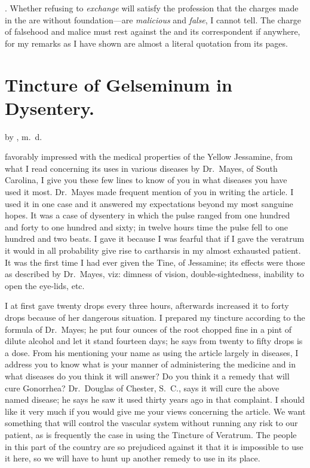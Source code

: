 . Whether refusing to \emph{exchange} will
satisfy the profession that the charges made in the  are without
foundation---are \emph{malicious} and \emph{false}, I cannot tell. The charge of falsehood
and malice must rest against the  and its correspondent
if anywhere, for my remarks as I have shown are almost a literal quotation
from its pages.

\section*{Tincture of Gelseminum in Dysentery.}

by , m.~d.

 favorably impressed with the medical properties of the Yellow
Jessamine, from what I read concerning its uses in various diseases by
Dr.~Mayes, of South Carolina, I give you these few lines to know of
you in what diseases you have used it most. Dr.~Mayes made frequent
mention of you in writing the article. I used it in one case and it answered
my expectations beyond my most sanguine hopes. It was a case
of dysentery in which the pulse ranged from one hundred and forty to
one hundred and sixty; in twelve hours time the pulse fell to one hundred
and two beats. I gave it because I was fearful that if I gave the
veratrum it would in all probability give rise to cartharsis in my almost
exhausted patient. It was the first time I had ever given the Tine, of
Jessamine; its effects were those as described by Dr.~Mayes, viz: dimness
of vision, double-sightedness, inability to open the eye-lids, etc.

I at first gave twenty drops every three hours, afterwards increased it
to forty drops because of her dangerous situation. I prepared my tincture
according to the formula of Dr.~Mayes; he put four ounces of the
root chopped fine in a pint of dilute alcohol and let it stand fourteen days;
he says from twenty to fifty drops is a dose. From his mentioning your
name as using the article largely in diseases, I address you to know
what is your manner of administering the medicine and in what diseases
do you think it will answer? Do you think it a remedy that will
cure Gonorrhea? Dr.~Douglas of Chester, S.~C., says it will cure the above
named disease; he says he saw it used thirty years ago in that complaint.
I should like it very much if you would give me your views concerning
the article. We want something that will control the vascular system
without running any risk to our patient, as is frequently the case in
using the Tincture of Veratrum. The people in this part of the country
are so prejudiced against it that it is impossible to use it here, so we will
have to hunt up another remedy to use in its place.\endinput
